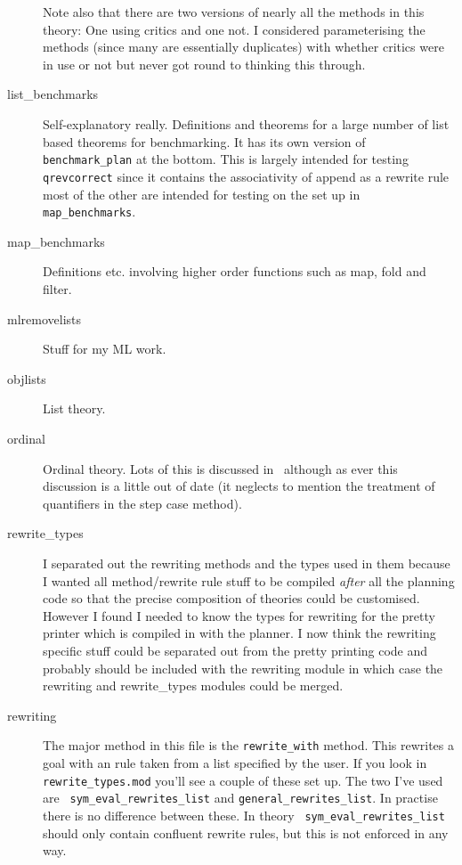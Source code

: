 \begin{description}
  Note also that there are two versions of nearly all the methods in
  this theory: One using critics and one not.  I
  considered parameterising the methods (since many are essentially
  duplicates) with whether critics were in use or not but never got
  round to thinking this through.
\item[list\_benchmarks\index{list\_benchmarks}] Self-explanatory
  really.  Definitions and theorems for a large number of list based
  theorems for benchmarking.  It has its own version of {\tt
    benchmark\_plan} at the bottom.  This is
  largely intended for testing {\tt qrevcorrect}
  since it contains the associativity of append as a rewrite rule most of the other
  are intended for testing on the set up in {\tt
    map\_benchmarks}.
\item[map\_benchmarks\index{map\_benchmarks}]
Definitions etc. involving higher order functions such as
map, fold and filter.
\item[mlremovelists\index{mlremovelists}]
Stuff for my ML work.
\item[objlists\index{objlists}]
List theory.  
\item[ordinal\index{ordinal}] Ordinal theory.  Lots of this is
  discussed in~\cite{DennisSmaill:TPHOLS01} although as ever this
  discussion is a little out of date (it neglects to mention the
  treatment of quantifiers in the step case method).
\item[rewrite\_types\index{rewrite\_types}] I separated out the
  rewriting methods and the types used in them
  because I wanted all method/rewrite rule stuff to be compiled {\em
    after} all the planning code so that the precise composition of
  theories could be customised.  However I found I needed to know the
  types for rewriting for the pretty printer
  which is compiled in with the planner.  I now think the rewriting
  specific stuff could be separated out from the pretty printing code
  and probably should be included with the rewriting
  module in which case the rewriting and
  rewrite\_types
  modules could be merged.
\item[rewriting\index{rewriting}] The major method in this file is the
  {\tt rewrite\_with} method.  This rewrites a
  goal with an rule taken from a list specified by the user.  If you
  look in {\tt rewrite\_types.mod} you'll see a couple of these set
  up.  The two I've used are {\tt
    sym\_eval\_rewrites\_list} and
  {\tt general\_rewrites\_list}.  In
  practise there is no difference between these.  In theory {\tt
    sym\_eval\_rewrites\_list} should only contain confluent rewrite
  rules, but this is not enforced in any way.
  

\end{description}

